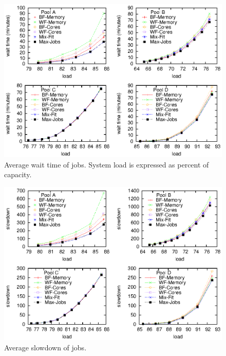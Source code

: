 \begin{figure}\centering
	\includegraphics[width=1.0\textwidth]{figures/avg-wait-with-max-jobs.eps}
\caption{Average wait time of jobs.
System load is expressed as percent of capacity.}
\label{fig:avg-wait-with-max-jobs}
\end{figure}

\begin{figure}\centering
	\includegraphics[width=1.0\textwidth]{figures/avg-slowdown-with-max-jobs.eps}
\caption{Average slowdown of jobs.}
\label{fig:avg-slowdown-with-max-jobs}
\end{figure}

